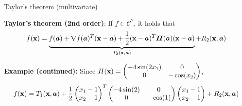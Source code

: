 \documentclass[11pt,compress,t,notes=noshow, xcolor=table]{beamer}
\begin{document}
\begin{vbframe}{Taylor's theorem (multivariate)}
\framebreak

\vspace*{-1cm}


\textbf{Taylor's theorem (2nd order)}: If $f \in \mathcal{C}^2$, it holds that
\begin{equation*}
    f(\mathbf{x}) = \underbrace{f(\bm{a}) + \nabla f(\bm{a})^T (\mathbf{x} - \bm{a}) + \frac{1}{2}(\mathbf{x} - \bm{a})^T\bm{H}(\bm{a})(\mathbf{x} - \bm{a})}_{T_2(\mathbf{x}, \bm{a})} + R_2(\mathbf{x},\bm{a})
\end{equation*}


\begin{footnotesize}
    \textbf{Example (continued):} Since $H(\mathbf{x}) = \begin{pmatrix} -4 \sin(2x_1) & 0 \\ 0 & -\cos(x_2) \end{pmatrix}$,
    \begin{equation*}
        f(\mathbf{x}) = T_1(\mathbf{x}, \bm{a}) + \frac{1}{2}\begin{pmatrix}x_1 - 1 \\ x_2 - 1 \end{pmatrix}^T \begin{pmatrix} -4 \sin(2) & 0 \\ 0 & -\cos(1) \end{pmatrix} \begin{pmatrix}x_1 - 1 \\ x_2 - 1 \end{pmatrix} + R_2(\mathbf{x}, \bm{a})
    \end{equation*}
\end{footnotesize}

\vspace*{-0.5\baselineskip}


\end{vbframe}
\end{document}
